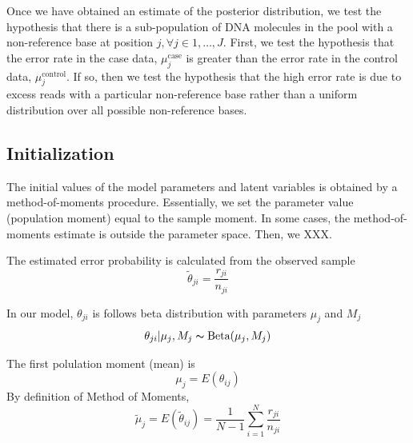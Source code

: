 \documentclass[11pt,reqno]{amsart}
\begin{document}
Once we have obtained an estimate of the posterior distribution, we test the hypothesis that there is a sub-population of DNA molecules in the pool with a non-reference base at position $j, \forall j \in 1, \ldots, J$. First, we test the hypothesis that the error rate in the case data, $\mu_j^{\text{case}}$ is greater than the error rate in the control data, $\mu_j^{\text{control}}$. If so, then we test the hypothesis that the high error rate is due to excess reads with a particular non-reference base rather than a uniform distribution over all possible non-reference bases.

\subsection{Initialization}
The initial values of the model parameters and latent variables is obtained by a method-of-moments procedure. Essentially, we set the parameter value (population moment) equal to the sample moment. In some cases, the method-of-moments estimate is outside the parameter space. Then, we XXX.

The estimated error probability is calculated from the observed sample
\begin{equation}
 \tilde{\theta}_{ji}=\frac{r_{ji}}{n_{ji}}
\end{equation}

In our model, $\theta_{ji}$ is follows beta distribution with parameters $\mu_j$ and $M_j$
\begin{align}
 \theta_{ji}|\mu_j,M_j\thicksim \text{Beta}(\mu_j,M_j)
\end{align}

The first polulation moment (mean) is 
\begin{equation}
 \mu_j=E(\theta_{ij})
\end{equation}
By definition of Method of Moments, 
\begin{equation}
 \tilde{\mu}_j = E(\tilde{\theta}_{ij}) = \frac{1}{N-1}\sum_{i=1}^N\frac{r_{ji}}{n_{ji}}
\end{equation}
\end{document}
